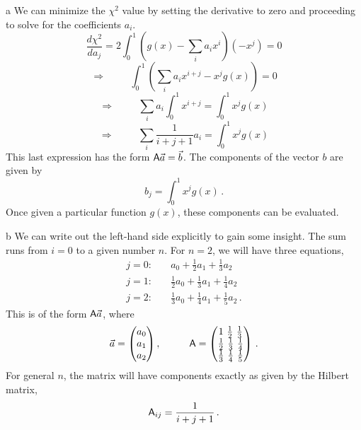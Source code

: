\documentclass[]{homework}
\begin{document}


\begin{problem}{1}


  \begin{subproblem}{a}
    We can minimize the $\chi^2$ value by setting the derivative to zero
    and proceeding to solve for the coefficients $a_i$.
    \[
    \frac{d \chi^2}{d a_j} = 2 \int_0^1 \left( g(x) - \sum_i a_i x^i \right) (-x^j) = 0
    \]
    \[
      \Rightarrow \hspace{1cm} \int_0^1 \left( \sum_i a_i x^{i+j} - x^j g(x) \right) = 0
    \]
    \[
      \Rightarrow \hspace{1cm} \sum_i a_i \int_0^1 x^{i+j} = \int_0^1 x^j g(x)
    \]
    \[
      \Rightarrow \hspace{1cm} \sum_i \frac{1}{i+j+1} a_i = \int_0^1 x^j g(x)
    \]
    This last expression has the form $\textsf{A} \vec{a} = \vec{b}$. The components of the
    vector $b$ are given by
    \[
    b_j = \int_0^1 x^j g(x)\,.
    \]
    Once given a particular function $g(x)$, these components can be evaluated.
  \end{subproblem}
  \begin{subproblem}{b}
    We can write out the left-hand side explicitly to gain some insight. The sum
    runs from $i=0$ to a given number $n$. For $n=2$, we will have three equations,
    \begin{align*}
      j=0:& \hspace{1em} a_0 + \frac{1}{2} a_1 + \frac{1}{3} a_2 \\
      j=1:& \hspace{1em} \frac{1}{2} a_0 + \frac{1}{3} a_1 + \frac{1}{4} a_2 \\
      j=2:& \hspace{1em} \frac{1}{3} a_0 + \frac{1}{4} a_1 + \frac{1}{5} a_2\,.
    \end{align*}
    This is of the form $\textsf{A} \vec{a}$, where
    \[
      \vec{a} = \begin{pmatrix} a_0 \\ a_1 \\ a_2 \end{pmatrix}, \hspace{1cm}
      \textsf{A} = \begin{pmatrix}
        1\,\, \frac{1}{2}\,\, \frac{1}{3} \\
        \frac{1}{2}\,\, \frac{1}{3}\,\, \frac{1}{4}\\
        \frac{1}{3}\,\, \frac{1}{4}\,\, \frac{1}{5}
      \end{pmatrix}\,.
    \]
    For general $n$, the matrix will have components exactly as given by the Hilbert matrix,
    \[
      \textsf{A}_{ij} = \frac{1}{i+j+1}\,.
    \]
  \end{subproblem}


\end{problem}
\end{document}
